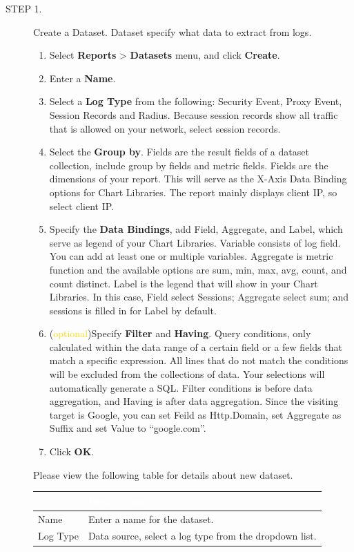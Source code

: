 \begin{description}
    \item[STEP 1.]	Create a Dataset. Dataset specify what data to extract from logs.
    \begin{enumerate}
        \item Select \textbf{Reports} > \textbf{Datasets} menu, and click \textbf{Create}.
        \item Enter a \textbf{Name}.
        \item Select a \textbf{Log Type} from the following: Security Event, Proxy Event, Session Records and Radius. Because session records show all traffic that is allowed on your network, select session records.
        \item Select the \textbf{Group by}. Fields are the result fields of a dataset collection, include group by fields and metric fields. Fields are the dimensions of your report. This will serve as the X-Axis Data Binding options for Chart Libraries. The report mainly displays client IP, so select client IP.
        \item Specify the \textbf{Data Bindings}, add Field, Aggregate, and Label, which serve as legend of your Chart Libraries. Variable consists of log field. You can add at least one or multiple variables. Aggregate is metric function and the available options are sum, min, max, avg, count, and count distinct. Label is the legend that will show in your Chart Libraries. In this case, Field select Sessions; Aggregate select sum; and sessions is filled in for Label by default.
        \item (\textcolor{gold}{optional})Specify \textbf{Filter} and \textbf{Having}. Query conditions, only calculated within the data range of a certain field or a few fields that match a specific expression. All lines that do not match the conditions will be excluded from the collections of data. Your selections will automatically generate a SQL. Filter conditions is before data aggregation, and Having is after data aggregation. Since the visiting target is Google, you can set Feild as Http.Domain, set Aggregate as Suffix and set Value to “google.com”. 
        \item Click \textbf{OK}.
    \end{enumerate}    

    \item[]Please view the following table for details about new dataset.

        \begin{longtable}{p{}|p{}}   
                \rowcolor{black}\multicolumn{1}{l!\vlinewhite}{\textcolor{white}{Field}}  & \textcolor{white}{Description} \\\hline                                                                                                                                                          
                Name & Enter a name for the dataset.\\\hline  
                Log Type & Data source, select a log type from the dropdown list. 
                            

\end{longtable}
\end{description}
